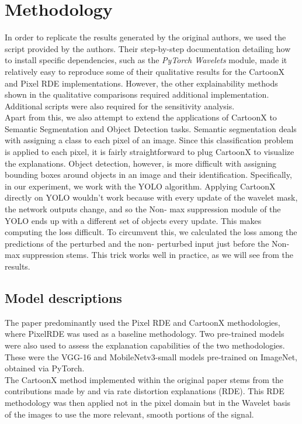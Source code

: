 \section{Methodology}\label{sec:methodology}
In order to replicate the results generated by the original authors, we used the script provided by the authors. Their step-by-step documentation detailing how to install specific dependencies, such as the {\it PyTorch Wavelets} module, made it relatively easy to reproduce some of their qualitative results for the CartoonX and Pixel RDE implementations. However, the other explainability methods shown in the qualitative comparisons required additional implementation. Additional scripts were also required for the sensitivity analysis. \\
Apart from this, we also attempt to extend the applications of CartoonX to Semantic Segmentation and Object Detection tasks. Semantic segmentation deals with assigning a class
to each pixel of an image. Since this classification problem is applied to each pixel,
it is fairly straightforward to plug CartoonX to visualize the explanations. Object detection, however, is more difficult with assigning bounding boxes around
objects in an image and their identification. Specifically, in our experiment, we
work with the YOLO algorithm. Applying CartoonX directly on YOLO wouldn’t work because with every update of the wavelet mask, the network outputs change, and so the Non‐
max suppression module of the YOLO ends up with a different set of objects every update. This makes computing the loss difficult. To circumvent this, we calculated the loss among the predictions of the perturbed and the non‐
perturbed input just before the Non‐max suppression stems. This trick works well in practice, as we will see from the results.\\

\subsection{Model descriptions}
The paper predominantly used the Pixel RDE and CartoonX methodologies, where PixelRDE was used as a baseline methodology. Two pre-trained models were also used to assess the explanation capabilities of the two methodologies. These were the VGG-16 \cite{simonyan2014very} and MobileNetv3-small \cite{howard2019searching} models pre-trained on ImageNet, obtained via PyTorch. \\ 
The CartoonX method implemented within the original paper stems from the contributions made by \cite{macdonald2019rate} and \cite{heiss2020distribution} via rate distortion explanations (RDE). This RDE methodology was then applied not in the pixel domain but in the Wavelet basis of the images to use the more relevant, smooth portions of the signal. 

